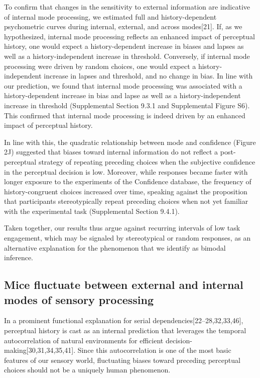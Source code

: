 \documentclass[
]{article}
\begin{document}
To confirm that changes in the sensitivity to external information are
indicative of internal mode processing, we estimated full and
history-dependent psychometric curves during internal, external, and
across modes{[}21{]}. If, as we hypothesized, internal mode processing
reflects an enhanced impact of perceptual history, one would expect a
history-dependent increase in biases and lapses as well as a
history-independent increase in threshold. Conversely, if internal mode
processing were driven by random choices, one would expect a
history-independent increase in lapses and threshold, and no change in
bias. In line with our prediction, we found that internal mode
processing was associated with a history-dependent increase in bias and
lapse as well as a history-independent increase in threshold
(Supplemental Section 9.3.1 and Supplemental Figure S6). This confirmed
that internal mode processing is indeed driven by an enhanced impact of
perceptual history.

In line with this, the quadratic relationship between mode and
confidence (Figure 2J) suggested that biases toward internal information
do not reflect a post-perceptual strategy of repeating preceding choices
when the subjective confidence in the perceptual decision is low.
Moreover, while responses became faster with longer exposure to the
experiments of the Confidence database, the frequency of
history-congruent choices increased over time, speaking against the
proposition that participants stereotypically repeat preceding choices
when not yet familiar with the experimental task (Supplemental Section
9.4.1).

Taken together, our results thus argue against recurring intervals of
low task engagement, which may be signaled by stereotypical or random
responses, as an alternative explanation for the phenomenon that we
identify as bimodal inference.

\hypertarget{mice-fluctuate-between-external-and-internal-modes-of-sensory-processing}{%
\subsection{Mice fluctuate between external and internal modes of
sensory
processing}\label{mice-fluctuate-between-external-and-internal-modes-of-sensory-processing}}

In a prominent functional explanation for serial
dependencies{[}22--28,32,33,46{]}, perceptual history is cast as an
internal prediction that leverages the temporal autocorrelation of
natural environments for efficient decision-making{[}30,31,34,35,41{]}.
Since this autocorrelation is one of the most basic features of our
sensory world, fluctuating biases toward preceding perceptual choices
should not be a uniquely human phenomenon.
\end{document}
